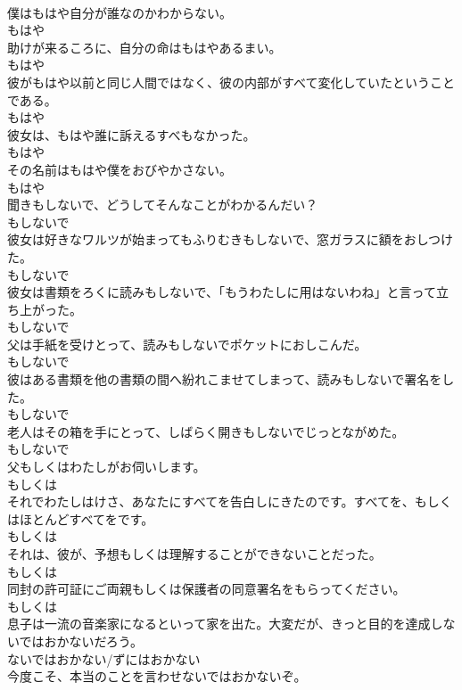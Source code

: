 \documentclass[8pt]{extreport}
\begin{document}
\begin{CJK}{UTF8}{min}
\\	僕はもはや自分が誰なのかわからない。	
\\	もはや
\\	助けが来るころに、自分の命はもはやあるまい。	
\\	もはや
\\	彼がもはや以前と同じ人間ではなく、彼の内部がすべて変化していたということである。	
\\	もはや
\\	彼女は、もはや誰に訴えるすべもなかった。	
\\	もはや
\\	その名前はもはや僕をおびやかさない。	
\\	もはや
\\	聞きもしないで、どうしてそんなことがわかるんだい？	
\\	もしないで
\\	彼女は好きなワルツが始まってもふりむきもしないで、窓ガラスに額をおしつけた。	
\\	もしないで
\\	彼女は書類をろくに読みもしないで、「もうわたしに用はないわね」と言って立ち上がった。	
\\	もしないで
\\	父は手紙を受けとって、読みもしないでポケットにおしこんだ。	
\\	もしないで
\\	彼はある書類を他の書類の間へ紛れこませてしまって、読みもしないで署名をした。	
\\	もしないで
\\	老人はその箱を手にとって、しばらく開きもしないでじっとながめた。	
\\	もしないで
\\	父もしくはわたしがお伺いします。	
\\	もしくは
\\	それでわたしはけさ、あなたにすべてを告白しにきたのです。すべてを、もしくはほとんどすべてをです。	
\\	もしくは
\\	それは、彼が、予想もしくは理解することができないことだった。	
\\	もしくは
\\	同封の許可証にご両親もしくは保護者の同意署名をもらってください。	
\\	もしくは
\\	息子は一流の音楽家になるといって家を出た。大変だが、きっと目的を達成しないではおかないだろう。	
\\	ないではおかない/ずにはおかない
\\	今度こそ、本当のことを言わせないではおかないぞ。	

\end{CJK}
\end{document}
